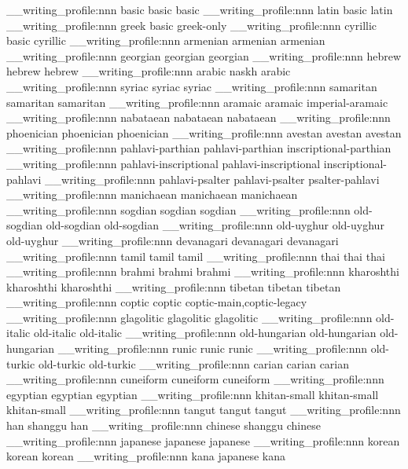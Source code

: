 \__writing_profile:nnn {basic} {basic} {basic}
\__writing_profile:nnn {latin} {basic} {latin}
\__writing_profile:nnn {greek} {basic} {greek-only}
\__writing_profile:nnn {cyrillic} {basic} {cyrillic}
\__writing_profile:nnn {armenian} {armenian} {armenian}
\__writing_profile:nnn {georgian} {georgian} {georgian}
\__writing_profile:nnn {hebrew} {hebrew} {hebrew}
\__writing_profile:nnn {arabic} {naskh} {arabic}
\__writing_profile:nnn {syriac} {syriac} {syriac}
\__writing_profile:nnn {samaritan} {samaritan} {samaritan}
\__writing_profile:nnn {aramaic} {aramaic} {imperial-aramaic}
\__writing_profile:nnn {nabataean} {nabataean} {nabataean}
\__writing_profile:nnn {phoenician} {phoenician} {phoenician}
\__writing_profile:nnn {avestan} {avestan} {avestan}
\__writing_profile:nnn {pahlavi-parthian} {pahlavi-parthian} {inscriptional-parthian}
\__writing_profile:nnn {pahlavi-inscriptional} {pahlavi-inscriptional} {inscriptional-pahlavi}
\__writing_profile:nnn {pahlavi-psalter} {pahlavi-psalter} {psalter-pahlavi}
\__writing_profile:nnn {manichaean} {manichaean} {manichaean}
\__writing_profile:nnn {sogdian} {sogdian} {sogdian}
\__writing_profile:nnn {old-sogdian} {old-sogdian} {old-sogdian}
\__writing_profile:nnn {old-uyghur} {old-uyghur} {old-uyghur}
\__writing_profile:nnn {devanagari} {devanagari} {devanagari}
\__writing_profile:nnn {tamil} {tamil} {tamil}
\__writing_profile:nnn {thai} {thai} {thai}
\__writing_profile:nnn {brahmi} {brahmi} {brahmi}
\__writing_profile:nnn {kharoshthi} {kharoshthi} {kharoshthi}
\__writing_profile:nnn {tibetan} {tibetan} {tibetan}
\__writing_profile:nnn {coptic} {coptic} {coptic-main,coptic-legacy}
\__writing_profile:nnn {glagolitic} {glagolitic} {glagolitic}
\__writing_profile:nnn {old-italic} {old-italic} {old-italic}
\__writing_profile:nnn {old-hungarian} {old-hungarian} {old-hungarian}
\__writing_profile:nnn {runic} {runic} {runic}
\__writing_profile:nnn {old-turkic} {old-turkic} {old-turkic}
\__writing_profile:nnn {carian} {carian} {carian}
\__writing_profile:nnn {cuneiform} {cuneiform} {cuneiform}
\__writing_profile:nnn {egyptian} {egyptian} {egyptian}
\__writing_profile:nnn {khitan-small} {khitan-small} {khitan-small}
\__writing_profile:nnn {tangut} {tangut} {tangut}
\__writing_profile:nnn {han} {shanggu} {han}
\__writing_profile:nnn {chinese} {shanggu} {chinese}
\__writing_profile:nnn {japanese} {japanese} {japanese}
\__writing_profile:nnn {korean} {korean} {korean}
\__writing_profile:nnn {kana} {japanese} {kana}

